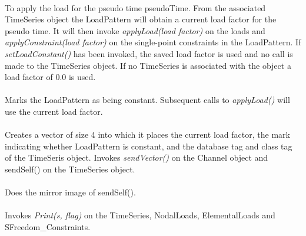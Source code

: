 \\
To apply the load for the pseudo time \p pseudoTime. From the
associated TimeSeries object the LoadPattern will obtain a current
load factor for the pseudo time. It will then invoke {\em
applyLoad(load factor)} on the loads and {\em applyConstraint(load
factor)} on the single-point constraints in the LoadPattern. If {\em
setLoadConstant()} has been invoked, the saved load factor is used and
no call is made to the TimeSeries object. If no TimeSeries is
associated with the object a load factor of $0.0$ is used. \\

\\ 
Marks the LoadPattern as being constant. Subsequent calls to {\em
applyLoad()} will use the current load factor. \\

\\
Creates a vector of size 4 into which it places the current load
factor, the mark indicating whether LoadPattern is constant, and the
database tag and class tag of the TimeSeris object. Invokes {\em
sendVector()} on the Channel object and sendSelf() on the
TimeSeries object. \\

\\
Does the mirror image of sendSelf(). \\

\\
Invokes {\em Print(s, flag)} on the TimeSeries, NodalLoads,
ElementalLoads and SFreedom\_Constraints. 
